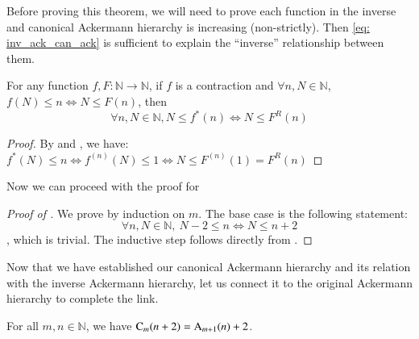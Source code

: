 Before proving this theorem, we will need to prove each 
function in the inverse and canonical Ackermann hierarchy 
is increasing (non-strictly). Then \eqref{eq: inv_ack_can_ack} 
is sufficient to explain the ``inverse'' relationship between them.

%
%
%
%

\begin{lem}  \label{lem: countdown_rep_app}
For any function $f, F: \mathbb{N} \to \mathbb{N}$, 
if $f$ is a contraction and $\forall n, N\in \mathbb{N}$, 
$f(N) \le n \iff N \le F(n)$, then
$$ \forall n, N\in \mathbb{N}, N\le f^*(n) \iff N \le F^R(n) $$
\end{lem}

\begin{proof}
By  and , we have:
$\displaystyle f^*(N)\le n \iff f^{(n)}(N) \le 1 \iff N \le F^{(n)}(1) = F^R(n) $
\end{proof}

Now we can proceed with the proof for 

\begin{proof}[Proof of ]
We prove by induction on $m$. The base case is the following statement:
$$ \forall n, N\in \mathbb{N}, \ N - 2\le n \iff N \le n + 2 $$
, which is trivial. The inductive step follows directly from .
\end{proof}

Now that we have established our canonical Ackermann hierarchy 
and its relation with the inverse Ackermann hierarchy, let us 
connect it to the original Ackermann hierarchy to complete the link.

\begin{thm} \label{thm: can_ack_ack}
For all $m, n\in \mathbb{N}$, we have $\text{C}_m(n+2) = \text{A}_{m+1}(n) + 2$.
\end{thm}

